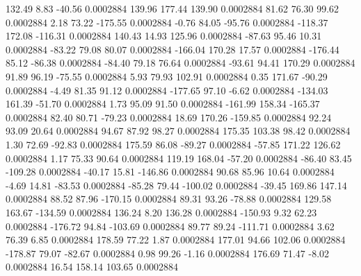       132.49        8.83      -40.56     0.0002884
      139.96      177.44      139.90     0.0002884
       81.62       76.30       99.62     0.0002884
        2.18       73.22     -175.55     0.0002884
       -0.76       84.05      -95.76     0.0002884
     -118.37      172.08     -116.31     0.0002884
      140.43       14.93      125.96     0.0002884
      -87.63       95.46       10.31     0.0002884
      -83.22       79.08       80.07     0.0002884
     -166.04      170.28       17.57     0.0002884
     -176.44       85.12      -86.38     0.0002884
      -84.40       79.18       76.64     0.0002884
      -93.61       94.41      170.29     0.0002884
       91.89       96.19      -75.55     0.0002884
        5.93       79.93      102.91     0.0002884
        0.35      171.67      -90.29     0.0002884
       -4.49       81.35       91.12     0.0002884
     -177.65       97.10       -6.62     0.0002884
     -134.03      161.39      -51.70     0.0002884
        1.73       95.09       91.50     0.0002884
     -161.99      158.34     -165.37     0.0002884
       82.40       80.71      -79.23     0.0002884
       18.69      170.26     -159.85     0.0002884
       92.24       93.09       20.64     0.0002884
       94.67       87.92       98.27     0.0002884
      175.35      103.38       98.42     0.0002884
        1.30       72.69      -92.83     0.0002884
      175.59       86.08      -89.27     0.0002884
      -57.85      171.22      126.62     0.0002884
        1.17       75.33       90.64     0.0002884
      119.19      168.04      -57.20     0.0002884
      -86.40       83.45     -109.28     0.0002884
      -40.17       15.81     -146.86     0.0002884
       90.68       85.96       10.64     0.0002884
       -4.69       14.81      -83.53     0.0002884
      -85.28       79.44     -100.02     0.0002884
      -39.45      169.86      147.14     0.0002884
       88.52       87.96     -170.15     0.0002884
       89.31       93.26      -78.88     0.0002884
      129.58      163.67     -134.59     0.0002884
      136.24        8.20      136.28     0.0002884
     -150.93        9.32       62.23     0.0002884
     -176.72       94.84     -103.69     0.0002884
       89.77       89.24     -111.71     0.0002884
        3.62       76.39        6.85     0.0002884
      178.59       77.22        1.87     0.0002884
      177.01       94.66      102.06     0.0002884
     -178.87       79.07      -82.67     0.0002884
        0.98       99.26       -1.16     0.0002884
      176.69       71.47       -8.02     0.0002884
       16.54      158.14      103.65     0.0002884

